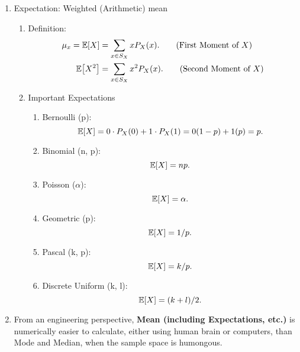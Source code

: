 \begin{enumerate}
{\begin{enumerate}
{\begin{enumerate}
                \item Mode: The outcome appears the most often in the sample space \[P_X(x_{\textnormal{mode}})\geq P_X(x).\]
                \item Median: The outcome which separates the higher half from  the lower half of a sample space \[P_X[X \leq x_{\textnormal{med}}] \geq 1/2, \qquad \qquad P_X[X \geq x_{\textnormal{med}}] \geq 1/2.\]
                \item (Arithmetic) mean:  The sum of all the outcomes divided by the number of outcomes \[\bar{x} = \frac{1}{n}\sum_{i=1}^{n}x_i.\]
            \end{enumerate}
            }
            \item Expectation: Weighted (Arithmetic) mean{
                \begin{enumerate}
                    \item Definition:{
                        \begin{align}
                            \mu_x = \E{X}&=\sum_{x\in S_X}xP_X(x). \tag{First Moment of $X$}\\
                            \E{X^2}&=\sum_{x\in S_X}x^2P_X(x). \tag{Second Moment of $X$}
                        \end{align}
                    }
                    \item Important Expectations{
                        \begin{enumerate}
                            \item Bernoulli (p): \[\E{X}=0\cdot P_X(0)+1\cdot P_X(1)=0(1-p)+1(p)=p.\]
                            \item Binomial (n, p): \[\E{X}=np.\]
                            \item Poisson ($\alpha$): \[\E{X}=\alpha.\]
                            \item Geometric (p): \[\E{X}=1/p.\]
                            \item Pascal (k, p): \[\E{X}=k/p.\]
                            \item Discrete Uniform (k, l): \[\E{X}=(k+l)/2.\]
                        \end{enumerate}
                    }
                \end{enumerate}
            }
            \item From an engineering perspective, \textbf{Mean (including Expectations, etc.)} is numerically easier to calculate, either using human brain or computers, than Mode and Median, when the sample space is humongous. 

\end{enumerate}}
\end{enumerate}

